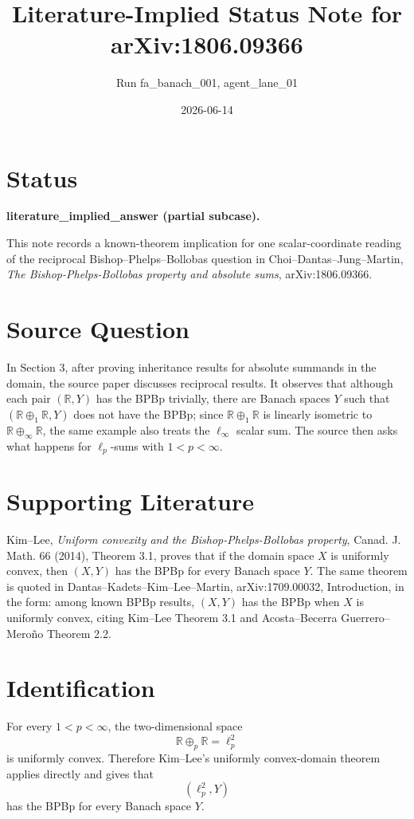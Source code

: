 \documentclass[11pt]{article}
\title{Literature-Implied Status Note for arXiv:1806.09366}
\author{Run fa\_banach\_001, agent\_lane\_01}
\date{2026-06-14}
\newcommand{\R}{\mathbb{R}}
\begin{document}
\maketitle

\section*{Status}

\textbf{literature\_implied\_answer (partial subcase).}

This note records a known-theorem implication for one scalar-coordinate
reading of the reciprocal Bishop--Phelps--Bollobas question in
Choi--Dantas--Jung--Martin, \emph{The Bishop-Phelps-Bollobas property
and absolute sums}, arXiv:1806.09366.

\section*{Source Question}

In Section 3, after proving inheritance results for absolute summands in the
domain, the source paper discusses reciprocal results.  It observes that
although each pair $(\R,Y)$ has the BPBp trivially, there are Banach spaces
$Y$ such that $(\R\oplus_1 \R,Y)$ does not have the BPBp; since
$\R\oplus_1\R$ is linearly isometric to $\R\oplus_\infty\R$, the same example
also treats the $\ell_\infty$ scalar sum.  The source then asks what happens
for $\ell_p$-sums with $1<p<\infty$.

\section*{Supporting Literature}

Kim--Lee, \emph{Uniform convexity and the Bishop-Phelps-Bollobas property},
Canad. J. Math. 66 (2014), Theorem 3.1, proves that if the domain space
$X$ is uniformly convex, then $(X,Y)$ has the BPBp for every Banach space
$Y$.  The same theorem is quoted in Dantas--Kadets--Kim--Lee--Martin,
arXiv:1709.00032, Introduction, in the form: among known BPBp results,
$(X,Y)$ has the BPBp when $X$ is uniformly convex, citing
Kim--Lee Theorem 3.1 and Acosta--Becerra Guerrero--Mero\~no Theorem 2.2.

\section*{Identification}

For every $1<p<\infty$, the two-dimensional space
\[
  \R\oplus_p\R = \ell_p^2
\]
is uniformly convex.  Therefore Kim--Lee's uniformly convex-domain theorem
applies directly and gives that
\[
  (\ell_p^2,Y)
\]
has the BPBp for every Banach space $Y$.
\end{document}
